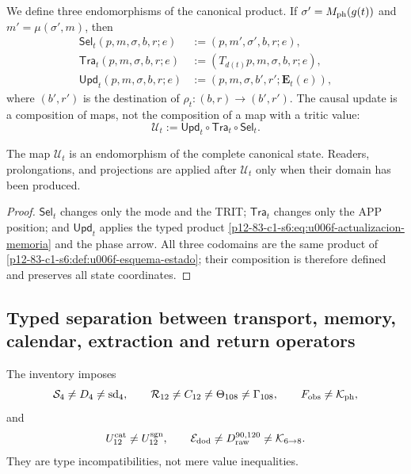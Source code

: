 {We define three endomorphisms of the canonical product. If
\(\sigma'=M_{\rm ph}(g(t))\) and \(m'=\mu(\sigma',m)\), then
\begin{align}
 \mathsf{Sel}_t(p,m,\sigma,b,r;e)
  &:=(p,m',\sigma',b,r;e),\label{p12-83-c1-s6:eq:u006f-selector-tipado}\\
 \mathsf{Tra}_t(p,m,\sigma,b,r;e)
  &:=(T_{d(t)}p,m,\sigma,b,r;e),\label{p12-83-c1-s6:eq:u006f-transporte-tipado}\\
 \mathsf{Upd}_t(p,m,\sigma,b,r;e)
  &:=(p,m,\sigma,b',r';\mathbf E_t(e)),
 \label{p12-83-c1-s6:eq:u006f-memoria-tipada}
\end{align}
where \((b',r')\) is the destination of \(\rho_t:(b,r)\to(b',r')\). The causal update is a composition of maps, not the composition of a map with a tritic value:
\begin{equation}
 \boxed{\mathcal U_t:=
 \mathsf{Upd}_t\circ\mathsf{Tra}_t\circ\mathsf{Sel}_t.}
 \label{p12-83-c1-s6:eq:u006f-tuberia}
\end{equation}

\begin{theorem}
\label{p12-83-c1-s6:thm:u006f-cierre-tuberia}
The map \(\mathcal U_t\) is an endomorphism of the complete canonical
state. Readers, prolongations, and projections are applied after
\(\mathcal U_t\) only when their domain has been produced.
\end{theorem}

\begin{proof}
\(\mathsf{Sel}_t\) changes only the mode and the TRIT;
\(\mathsf{Tra}_t\) changes only the APP position; and \(\mathsf{Upd}_t\) applies the
typed product \eqref{p12-83-c1-s6:eq:u006f-actualizacion-memoria} and the phase arrow. All three codomains are the
same product of \cref{p12-83-c1-s6:def:u006f-esquema-estado}; their composition is therefore defined and
preserves all state coordinates.
\end{proof}

\subsection{Typed separation between transport, memory, calendar, extraction and return operators}

The inventory imposes
\begin{equation}
 \mathcal S_4\neq D_4\neq\operatorname{sd}_4,
 \qquad
 \mathcal R_{12}\neq C_{12}\neq\Theta_{108}\neq\Gamma_{108},
 \qquad
 F_{\rm obs}\neq\mathcal K_{\rm ph},
 \label{p12-83-c1-s6:eq:u006f-no-identificacion-uno}
\end{equation}
and
\begin{equation}
 U_{12}^{\rm cat}\neq U_{12}^{\rm sgn},
 \qquad
 \mathcal E_{\rm dod}\neq D_{\rm raw}^{90,120}
 \neq\mathcal K_{6\to8}.
 \label{p12-83-c1-s6:eq:u006f-no-identificacion-dos}
\end{equation}
They are type incompatibilities, not mere value inequalities.

}
